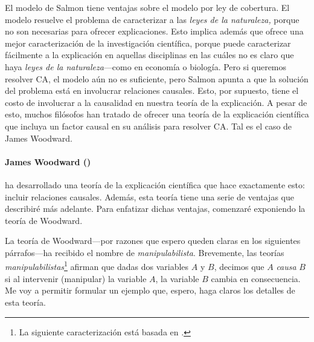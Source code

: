 El modelo de Salmon tiene ventajas sobre el modelo por ley
de cobertura. El modelo resuelve el problema de caracterizar
a las \emph{leyes de la naturaleza,} porque no son
necesarias para ofrecer explicaciones. Esto implica además
que ofrece una mejor caracterización de la investigación
científica, porque puede caracterizar fácilmente a la
explicación en aquellas disciplinas en las cuáles no es
claro que haya \emph{leyes de la naturaleza}---como en
economía o biología. Pero si queremos resolver CA, el modelo
aún no es suficiente, pero Salmon apunta a que la solución
del problema está en involucrar relaciones causales. Esto,
por supuesto, tiene el costo de involucrar a la causalidad
en nuestra teoría de la explicación. A pesar de esto, muchos
filósofos han tratado de ofrecer una teoría de la
explicación científica que incluya un factor causal en su
análisis para resolver CA. Tal es el caso de James
Woodward.

\paragraph{James Woodward (\citeyear{Woodward2004})} 
ha desarrollado una teoría de la explicación científica que
hace exactamente esto: incluir relaciones causales. Además,
esta teoría tiene una serie de ventajas que describiré más
adelante. Para enfatizar dichas ventajas, comenzaré
exponiendo la teoría de Woodward. 

La teoría de Woodward---por razones que espero queden claras en
los siguientes párrafos---ha recibido el nombre de
\emph{manipulabilista}. Brevemente, las teorías
\emph{manipulabilistas}\footnote{
  La siguiente  caracterización está basada en
  \parencite{sep-causation-mani,
             sep-causal-explanation-science, 
             Woodward2004,
             Woodward2000-WOOEAI}. 
}
afirman que dadas dos variables $ A $ y $ B $, decimos que $
A $ \emph{causa} $ B $ si al intervenir (manipular) la
variable $ A $, la variable $ B $ cambia en consecuencia. Me
voy a permitir formular un ejemplo que, espero, haga claros
los detalles de esta teoría.

